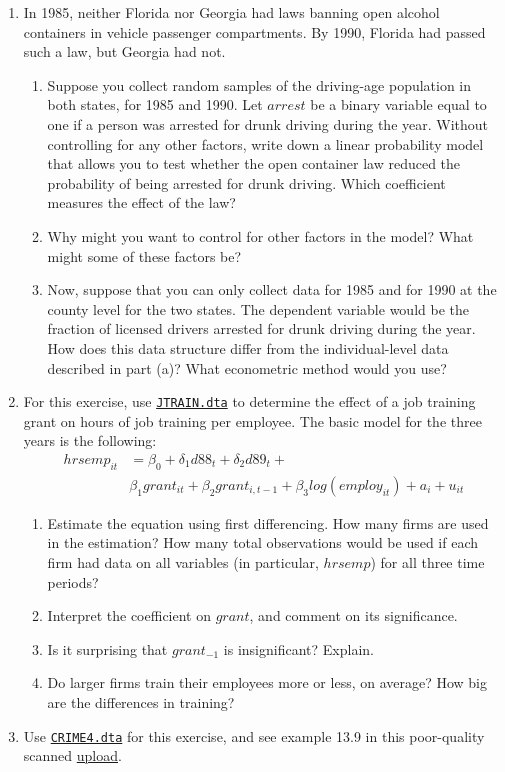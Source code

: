\documentclass[
]{article}
\begin{document}
\begin{enumerate}
\def\labelenumi{\arabic{enumi}.}
\item
  In 1985, neither Florida nor Georgia had laws banning open alcohol
  containers in vehicle passenger compartments. By 1990, Florida had
  passed such a law, but Georgia had not.

  \begin{enumerate}
  \def\labelenumii{\alph{enumii}.}
  \item
    Suppose you collect random samples of the driving-age population in
    both states, for 1985 and 1990. Let \(arrest\) be a binary variable
    equal to one if a person was arrested for drunk driving during the
    year. Without controlling for any other factors, write down a linear
    probability model that allows you to test whether the open container
    law reduced the probability of being arrested for drunk driving.
    Which coefficient measures the effect of the law?
  \item
    Why might you want to control for other factors in the model? What
    might some of these factors be?
  \item
    Now, suppose that you can only collect data for 1985 and for 1990 at
    the county level for the two states. The dependent variable would be
    the fraction of licensed drivers arrested for drunk driving during
    the year. How does this data structure differ from the
    individual-level data described in part (a)? What econometric method
    would you use?
  \end{enumerate}
\item
  For this exercise, use
  \href{../materials/JTRAIN.dta}{\texttt{JTRAIN.dta}} to determine the
  effect of a job training grant on hours of job training per employee.
  The basic model for the three years is the following: \[\begin{split} 
  hrsemp_{it} &= \beta_0 + \delta_1 d88_t + \delta_2 d89_t +\\
  &  \beta_1 grant_{it} + \beta_2 grant_{i,t-1} + \beta_3 log(employ_{it}) + a_i + u_{it}
  \end{split}\]

  \begin{enumerate}
  \def\labelenumii{\alph{enumii}.}
  \item
    Estimate the equation using first differencing. How many firms are
    used in the estimation? How many total observations would be used if
    each firm had data on all variables (in particular, \(hrsemp\)) for
    all three time periods?
  \item
    Interpret the coefficient on \(grant\), and comment on its
    significance.
  \item
    Is it surprising that \(grant_{-1}\) is insignificant? Explain.
  \item
    Do larger firms train their employees more or less, on average? How
    big are the differences in training?
  \end{enumerate}
\item
  Use \href{../materials/CRIME4.dta}{\texttt{CRIME4.dta}} for this
  exercise, and see example 13.9 in this poor-quality scanned
  \href{../materials/example-13.9.pdf}{upload}.


\end{enumerate}
\end{document}
